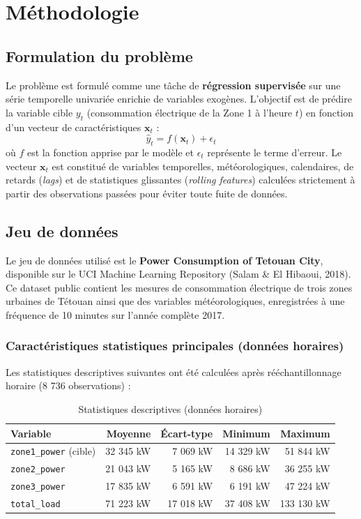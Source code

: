 \documentclass[12pt,a4paper]{article}
\begin{document}
\section{Méthodologie}
\subsection{Formulation du problème}
Le problème est formulé comme une tâche de \textbf{régression supervisée} sur une série temporelle univariée enrichie de variables exogènes. L'objectif est de prédire la variable cible $y_t$ (consommation électrique de la Zone 1 à l'heure $t$) en fonction d'un vecteur de caractéristiques $\mathbf{x}_t$ :
\begin{equation}
\hat{y}_t = f(\mathbf{x}_t) + \epsilon_t
\end{equation}
où $f$ est la fonction apprise par le modèle et $\epsilon_t$ représente le terme d'erreur. Le vecteur $\mathbf{x}_t$ est constitué de variables temporelles, météorologiques, calendaires, de retards (\textit{lags}) et de statistiques glissantes (\textit{rolling features}) calculées strictement à partir des observations passées pour éviter toute fuite de données.

\subsection{Jeu de données}
Le jeu de données utilisé est le \textbf{Power Consumption of Tetouan City}, disponible sur le UCI Machine Learning Repository (Salam \& El Hibaoui, 2018). Ce dataset public contient les mesures de consommation électrique de trois zones urbaines de Tétouan ainsi que des variables météorologiques, enregistrées à une fréquence de 10 minutes sur l'année complète 2017.

\subsubsection{Caractéristiques statistiques principales (données horaires)}
Les statistiques descriptives suivantes ont été calculées après rééchantillonnage horaire (8 736 observations) :

\begin{table}[h]
\centering
\begin{tabular}{lrrrr}
\toprule
\textbf{Variable} & \textbf{Moyenne} & \textbf{Écart-type} & \textbf{Minimum} & \textbf{Maximum} \\
\midrule
\texttt{zone1\_power} (cible) & 32 345 kW & 7 069 kW & 14 329 kW & 51 844 kW \\
\texttt{zone2\_power} & 21 043 kW & 5 165 kW & 8 686 kW & 36 255 kW \\
\texttt{zone3\_power} & 17 835 kW & 6 591 kW & 6 191 kW & 47 224 kW \\
\texttt{total\_load} & 71 223 kW & 17 018 kW & 37 408 kW & 133 130 kW \\
\bottomrule
\end{tabular}
\caption{Statistiques descriptives (données horaires)}
\end{table}
\end{document}
